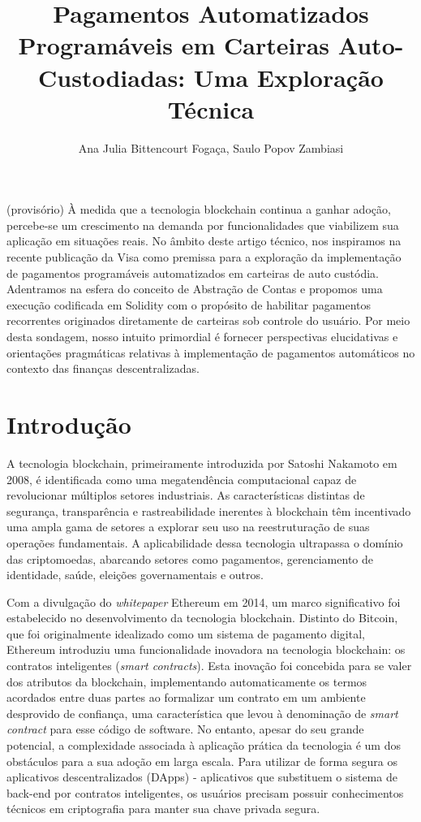 \documentclass[12pt]{article}
\title{Pagamentos Automatizados Programáveis em Carteiras Auto-Custodiadas: Uma Exploração Técnica}
\author{Ana Julia Bittencourt Fogaça\inst{1}, Saulo Popov Zambiasi\inst{2} }
\begin{document}
\maketitle

\begin{abstract}
\end{abstract}

\begin{resumo}
  (provisório) À medida que a tecnologia blockchain continua a ganhar adoção, percebe-se um crescimento na demanda por funcionalidades que viabilizem sua aplicação em situações reais. No âmbito deste artigo técnico, nos inspiramos na recente publicação da Visa como premissa para a exploração da implementação de pagamentos
  programáveis automatizados em carteiras de auto custódia. Adentramos na esfera do conceito de Abstração de
  Contas e propomos uma execução codificada em Solidity com o propósito de habilitar pagamentos recorrentes
  originados diretamente de carteiras sob controle do usuário. Por meio desta sondagem, nosso intuito   primordial é fornecer perspectivas elucidativas e orientações pragmáticas relativas à implementação de
  pagamentos automáticos no contexto das finanças descentralizadas.
\end{resumo}

\section{Introdução}
A tecnologia blockchain, primeiramente introduzida por Satoshi Nakamoto em 2008, é identificada
como uma megatendência computacional capaz de revolucionar múltiplos setores industriais\cite{1}.
As características distintas de segurança, transparência e rastreabilidade inerentes à blockchain
têm incentivado uma ampla gama de setores a explorar seu uso na reestruturação de suas operações
fundamentais. A aplicabilidade dessa tecnologia ultrapassa o domínio das criptomoedas, abarcando
setores como pagamentos, gerenciamento de identidade, saúde, eleições governamentais e
outros\cite{2}.

Com a divulgação do \textit{whitepaper} Ethereum em 2014, um marco significativo foi estabelecido
no desenvolvimento da tecnologia blockchain\cite{3}. Distinto do Bitcoin, que foi originalmente
idealizado como um sistema de pagamento digital, Ethereum introduziu uma funcionalidade inovadora
na tecnologia blockchain: os contratos inteligentes (\textit{smart contracts}). Esta inovação foi
concebida para se valer dos atributos da blockchain, implementando automaticamente os termos
acordados entre duas partes ao formalizar um contrato em um ambiente desprovido de confiança, uma
característica que levou à denominação de \textit{smart contract} para esse código de
software\cite{4}. No entanto, apesar do seu grande potencial, a complexidade associada à aplicação
prática da tecnologia é um dos obstáculos para a sua adoção em larga escala\cite{11}. Para utilizar
de forma segura os aplicativos descentralizados (DApps) - aplicativos que substituem o sistema de
back-end por contratos inteligentes, os usuários precisam possuir conhecimentos técnicos em
criptografia para manter sua chave privada segura\cite{6}.
\end{document}

